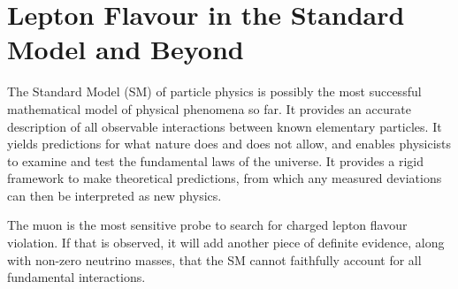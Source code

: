 \chapter{Lepton Flavour in the Standard Model and Beyond}\label{chapter1}






The Standard Model (SM) of particle physics is possibly the most successful
mathematical model of physical phenomena so far. It provides an accurate
description of all observable interactions between known elementary particles.
It yields predictions for what nature does and does not allow, and enables
physicists to examine and test the fundamental laws of the universe. It provides
a rigid framework to make theoretical predictions, from which any measured
deviations can then be interpreted as new physics.

The muon is the most sensitive probe to search for charged lepton flavour
violation. If that is observed, it will add another piece of definite evidence,
along with non-zero neutrino masses, that the SM cannot faithfully account for
all fundamental interactions.






